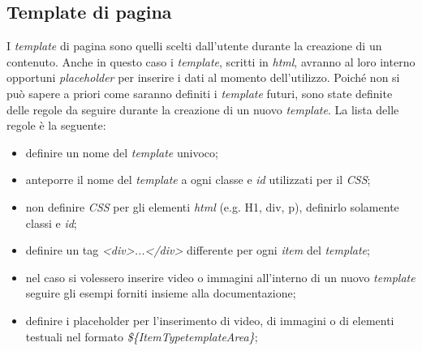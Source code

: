 \subsection{Template di pagina}
I \textit{template} di pagina sono quelli scelti dall'utente durante la creazione di un contenuto.
Anche in questo caso i \textit{template}, scritti in \textit{html}, avranno al loro interno opportuni \textit{placeholder} per inserire i dati al momento dell'utilizzo. Poiché non si può sapere a priori come saranno definiti i \textit{template} futuri, sono state definite delle regole da seguire durante la creazione di un nuovo \textit{template}. La lista delle regole è la seguente:
\begin{itemize}
    \item definire un nome del \textit{template} univoco;
    \item anteporre il nome del \textit{template} a ogni classe e \textit{id} utilizzati per il \textit{CSS};
    \item non definire \textit{CSS} per gli elementi \textit{html} (e.g. H1, div, p), definirlo solamente classi e \textit{id};
    \item definire un tag \textit{<div>...</div>} differente per ogni \textit{item} del \textit{template};
    \item nel caso si volessero inserire video o immagini all'interno di un nuovo \textit{template} seguire gli esempi forniti insieme alla documentazione;
    \item definire i placeholder per l'inserimento di video, di immagini o di elementi testuali nel formato \textit{\$\{ItemType\textit{template}Area\}};
\end{itemize}

